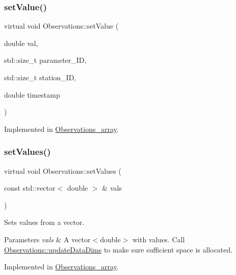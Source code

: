 \subsubsection{\texorpdfstring{set\+Value()}{setValue()}\hspace{0.1cm}{\footnotesize\ttfamily [2/2]}}
{\footnotesize\ttfamily virtual void Observations\+::set\+Value (\begin{DoxyParamCaption}\item[{double}]{val,  }\item[{std\+::size\+\_\+t}]{parameter\+\_\+\+ID,  }\item[{std\+::size\+\_\+t}]{station\+\_\+\+ID,  }\item[{double}]{timestamp }\end{DoxyParamCaption})\hspace{0.3cm}{\ttfamily [pure virtual]}}



Implemented in \mbox{\hyperlink{class_observations__array_a3994f0e11a8207c5e1182a9b20a67ec4}{Observations\+\_\+array}}.

\mbox{\label{class_observations_a3aaf49cad714ff61c105d26b4b083ac3}} 
\subsubsection{\texorpdfstring{set\+Values()}{setValues()}}
{\footnotesize\ttfamily virtual void Observations\+::set\+Values (\begin{DoxyParamCaption}\item[{const std\+::vector$<$ double $>$ \&}]{vals }\end{DoxyParamCaption})\hspace{0.3cm}{\ttfamily [pure virtual]}}

Sets values from a vector.


\begin{DoxyParams}{Parameters}
{\em vals} & A vector$<$double$>$ with values. Call \mbox{\hyperlink{class_observations_aab0540879c2d3fdf5f91d30ea2f902fd}{Observations\+::update\+Data\+Dims}} to make sure sufficient space is allocated. \\
\hline
\end{DoxyParams}


Implemented in \mbox{\hyperlink{class_observations__array_ae4ed49512506eae597a158d4c87dbd31}{Observations\+\_\+array}}.

